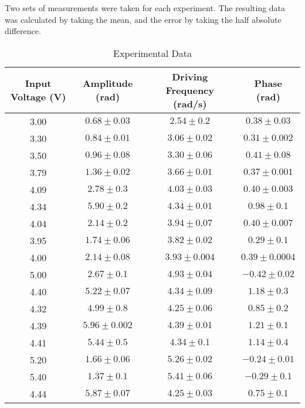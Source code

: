 Two sets of measurements were taken for each experiment. The resulting data was calculated by taking the mean, and the error by taking the half absolute difference. 

\begin{table}[H]
\centering
\caption{Experimental Data}
\label{tab:data}
\begin{tabular}{cccc}
\hline
\textbf{Input Voltage (V)} & \textbf{Amplitude (rad)} & \textbf{Driving Frequency (rad/s)} & \textbf{Phase (rad)} \\
\hline
3.00 & $0.68 \pm 0.03$ & $2.54 \pm 0.2$   & $0.38 \pm 0.03$ \\
3.30 & $0.84 \pm 0.01$ & $3.06 \pm 0.02$  & $0.31 \pm 0.002$ \\
3.50 & $0.96 \pm 0.08$ & $3.30 \pm 0.06$  & $0.41 \pm 0.08$ \\
3.79 & $1.36 \pm 0.02$ & $3.66 \pm 0.01$  & $0.37 \pm 0.001$ \\
4.09 & $2.78 \pm 0.3$  & $4.03 \pm 0.03$  & $0.40 \pm 0.003$ \\
4.34 & $5.90 \pm 0.2$  & $4.34 \pm 0.01$  & $0.98 \pm 0.1$ \\
4.04 & $2.14 \pm 0.2$  & $3.94 \pm 0.07$  & $0.40 \pm 0.007$ \\
3.95 & $1.74 \pm 0.06$ & $3.82 \pm 0.02$  & $0.29 \pm 0.1$ \\
4.00 & $2.14 \pm 0.08$ & $3.93 \pm 0.004$ & $0.39 \pm 0.0004$ \\
5.00 & $2.67 \pm 0.1$  & $4.93 \pm 0.04$  & $-0.42 \pm 0.02$ \\
4.40 & $5.22 \pm 0.07$ & $4.34 \pm 0.09$  & $1.18 \pm 0.3$ \\
4.32 & $4.99 \pm 0.8$  & $4.25 \pm 0.06$  & $0.85 \pm 0.2$ \\
4.39 & $5.96 \pm 0.002$& $4.39 \pm 0.01$  & $1.21 \pm 0.1$ \\
4.41 & $5.44 \pm 0.5$  & $4.34 \pm 0.1$   & $1.14 \pm 0.4$ \\
5.20 & $1.66 \pm 0.06$ & $5.26 \pm 0.02$  & $-0.24 \pm 0.01$ \\
5.40 & $1.37 \pm 0.1$  & $5.41 \pm 0.06$  & $-0.29 \pm 0.1$ \\
4.44 & $5.87 \pm 0.07$ & $4.25 \pm 0.03$  & $0.75 \pm 0.1$ \\
\end{tabular}
\end{table}
